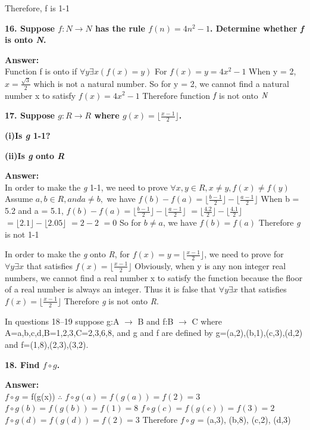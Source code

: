 \documentclass{article}
\begin{document}
\begin{large}
Therefore, f is 1-1


\textbf{16. Suppose $f:N\to N$ has the rule $f(n)=4n^2-1$. Determine whether \emph{f} is onto \emph{N}.}

\textbf{Answer:} \\

Function f is onto if $\forall y \exists x (f(x) = y)$
For $f(x) = y = 4x^2 - 1$
When y = 2, $x = \frac{\sqrt 3}{2}$ which is not a natural number.
So for y = 2, we cannot find a natural number x to satisfy $f(x) = 4x^2 - 1$
Therefore function $\emph{f}$ is not onto $\emph{N}$


\textbf{17. Suppose $g:R\to R$ where $g(x)=\lfloor \frac{x-1}{2}\rfloor$.}

\textbf{(i)Is \emph{g} 1-1?}

\textbf{(ii)Is \emph{g} onto \emph{R}}

\textbf{Answer:} \\

In order to make the \emph{g} 1-1, we need to prove $\forall x, y \in R, x \neq y, f(x) \neq f(y)$
Assume $a, b \in R, and a \neq b,$ we have
$f(b) - f(a) = \lfloor \frac{b-1}{2} \rfloor - \lfloor \frac{a-1}{2} \rfloor$
When b = 5.2 and a = 5.1, 
$f(b) - f(a) = \lfloor \frac{b-1}{2} \rfloor - \lfloor \frac{a-1}{2} \rfloor$
            $= \lfloor \frac{4.2}{2} \rfloor - \lfloor \frac{4.1}{2} \rfloor$
            $= \lfloor 2.1 \rfloor - \lfloor 2.05 \rfloor$
            $= 2 - 2$
            $= 0$
So for $b \neq a$, we have $f(b) = f(a)$
Therefore \emph{g} is not 1-1

In order to make the \emph{g} onto \emph{R}, 
for $f(x) = y = \lfloor \frac{x-1}{2}\rfloor$, we need to prove for $\forall y \exists x$ that satisfies $f(x) = \lfloor \frac{x-1}{2}\rfloor$
Obviously, when y is any non integer real numbers, we cannot find a real number x to satisfy the function because the floor of a real number is always an integer.
Thus it is false that $\forall y \exists x$ that satisfies $f(x) = \lfloor \frac{x-1}{2}\rfloor$
Therefore \emph{g} is not onto \emph{R}.


In questions 18–19 suppose g:A $\to$ B and f:B $\to$ C where A={a,b,c,d},B={1,2,3},C={2,3,6,8}, and g and f are defined by g={(a,2),(b,1),(c,3),(d,2)} and f={(1,8),(2,3),(3,2)}.

\textbf{18. Find $f\circ g$.}

\textbf{Answer:} \\

$f \circ g$ = f(g(x))
$\therefore$ $f \circ g(a) = f(g(a)) = f(2) = 3$
             $f \circ g(b) = f(g(b)) = f(1) = 8$
             $f \circ g(c) = f(g(c)) = f(3) = 2$
             $f \circ g(d) = f(g(d)) = f(2) = 3$
Therefore $f \circ g$ = {(a,3), (b,8), (c,2), (d,3)}



\end{large}
\end{document}
